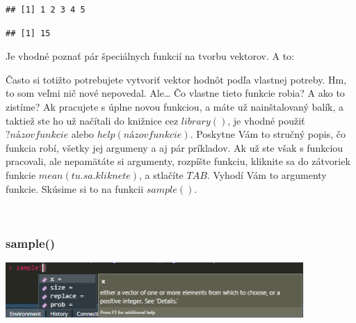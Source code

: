 \begin{verbatim}
## [1] 1 2 3 4 5
\end{verbatim}

\begin{Shaded}
\begin{Highlighting}[]
\end{Highlighting}
\end{Shaded}

\begin{verbatim}
## [1] 15
\end{verbatim}

Je vhodné poznať pár špeciálnych funkcií na tvorbu vektorov. A to:

\begin{Shaded}
\begin{Highlighting}[]
\end{Highlighting}
\end{Shaded}

Často si totižto potrebujete vytvoriť vektor hodnôt podľa vlastnej
potreby. Hm, to som veľmi nič nové nepovedal. Ale\ldots{} Čo vlastne
tieto funkcie robia? A ako to zistíme? Ak pracujete s úplne novou
funkciou, a máte už nainštalovaný balík, a taktiež ste ho už načítali do
knižnice cez \(library()\), je vhodné použiť \(?názovfunkcie\) alebo
\(help(názovfunkcie)\). Poskytne Vám to stručný popis, čo funkcia robí,
všetky jej argumeny a aj pár príkladov. Ak už ste však s funkciou
pracovali, ale nepamätáte si argumenty, rozpíšte funkciu, kliknite sa do
zátvoriek funkcie \(mean(tu.sa.kliknete)\), a stlačíte \(TAB\). Vyhodí
Vám to argumenty funkcie. Skúsime si to na funkcii \(sample()\).

~

\hypertarget{sample}{%
\subsubsection{sample()}\label{sample}}

\begin{center}

\includegraphics[width=0.85\textwidth,height=\textheight]{diplomka obrazky/2.png}

\end{center}

